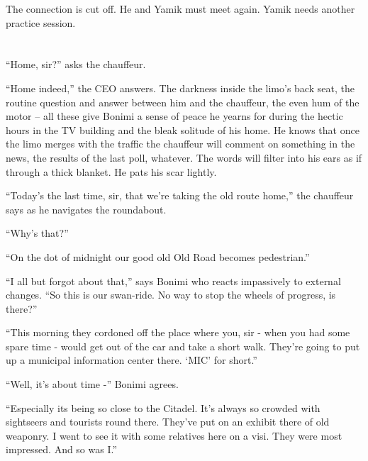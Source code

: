 \documentclass[twoside,11pt]{book}
\begin{document}
The connection is cut off. He and Yamik must meet again. Yamik needs another practice session.



\chapter{}

``Home, sir?'' asks the chauffeur.

``Home indeed,'' the CEO answers. The darkness inside the limo's back seat,
the routine question and answer between him and the chauffeur, the even hum of the motor -- all these give Bonimi a
sense of peace he yearns for during the hectic hours in the TV building and the bleak solitude of his
home. He knows that once the limo merges with the traffic the chauffeur will comment on something in the news, the
results of the last poll, whatever. The words will filter into his ears as if through a thick blanket. He pats his
scar lightly.

``Today's the last time, sir, that we're taking the old route home,'' the chauffeur says as he
navigates the roundabout.

``Why's that?''

``On the dot of midnight our good old Old Road becomes pedestrian.''

``I all but forgot about that,'' says Bonimi who reacts impassively to external changes.
``So this is our swan-ride. No way to stop the wheels of progress, is there?''

``This morning they cordoned off the place where you, sir - when you had some spare time - would get out of
the car and take a short walk. They're going to put up a municipal information center there. `MIC' for
short.''

``Well, it's about time -'' Bonimi agrees. \

``Especially its being so close to the Citadel. It's always so crowded with sightseers and tourists round
there. They've put on an exhibit there of old weaponry. I went to see it with some relatives here on a visi. They were
most impressed. And so was I.''
\end{document}
